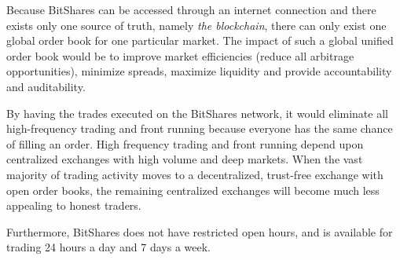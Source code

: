 Because BitShares can be accessed through an internet connection and there
exists only one source of truth, namely \emph{the blockchain}, there can only
exist one global order book for one particular market. The impact of such a
global unified order book would be to improve market efficiencies (reduce all
arbitrage opportunities), minimize spreads, maximize liquidity and provide
accountability and auditability. 

By having the trades executed on the BitShares network, it would eliminate all
high-frequency trading and front running because everyone has the same chance
of filling an order. High frequency trading and front running depend upon
centralized exchanges with high volume and deep markets. When the vast majority
of trading activity moves to a decentralized, trust-free exchange with open
order books, the remaining centralized exchanges will become much less
appealing to honest traders.

Furthermore, BitShares does not have restricted open hours, and is available
for trading 24 hours a day and 7 days a week.
